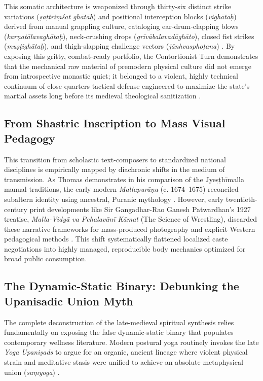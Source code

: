 \documentclass[11pt,twoside,letterpaper]{article}
\begin{document}
This somatic architecture is weaponized through thirty-six distinct strike variations (\textit{ṣaṭtriṃśat ghātāḥ}) and positional interception blocks (\textit{vighātāḥ}) derived from manual grappling culture, cataloging ear-drum-clapping blows (\textit{karṇatālavaghātaḥ}), neck-crushing drops (\textit{grīvābalavadāghāto}), closed fist strikes (\textit{muṣṭighātaḥ}), and thigh-slapping challenge vectors (\textit{jānhvasphoṭana}) \citep{MP_7, OHanlon2007}. By exposing this gritty, combat-ready portfolio, the Contortionist Turn demonstrates that the mechanical raw material of premodern physical culture did not emerge from introspective monastic quiet; it belonged to a violent, highly technical continuum of close-quarters tactical defense engineered to maximize the state's martial assets long before its medieval theological sanitization \citep{MP_7, Wujastyk2025}.


\subsection{From Shastric Inscription to Mass Visual Pedagogy}
This transition from scholastic text-composers to standardized national disciplines is empirically mapped by diachronic shifts in the medium of transmission. As Thomas demonstrates in his comparison of the Jyeṣṭhīmalla manual traditions, the early modern \textit{Mallapurāṇa} (c. 1674–1675) reconciled subaltern identity using ancestral, Puranic mythology \citep{Thomas2025}. However, early twentieth-century print developments like Sir Gangadhar-Rao Ganesh Patwardhan's 1927 treatise, \textit{Malla-Vidyā va Pehalavānī Kāmat} (The Science of Wrestling), discarded these narrative frameworks for mass-produced photography and explicit Western pedagogical methods \citep{Patwardhan1927, Thomas2025}. This shift systematically flattened localized caste negotiations into highly managed, reproducible body mechanics optimized for broad public consumption.

\subsection{The Dynamic-Static Binary: Debunking the Upanisadic Union Myth}
The complete deconstruction of the late-medieval spiritual synthesis relies fundamentally on exposing the false dynamic-static binary that populates contemporary wellness literature. Modern postural yoga routinely invokes the late \textit{Yoga Upaniṣads} to argue for an organic, ancient lineage where violent physical strain and meditative stasis were unified to achieve an absolute metaphysical union (\textit{saṃyoga}) \citep{Bouy1994}. 
\end{document}
